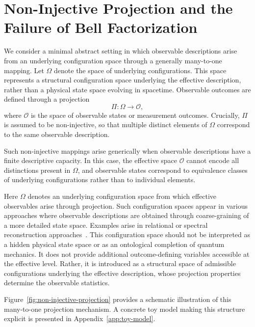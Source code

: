 \section{Non-Injective Projection and the Failure of Bell Factorization}
  \label{sec:non-injective-projection}

  We consider a minimal abstract setting in which observable descriptions arise from
  an underlying configuration space through a generally many-to-one mapping.
  Let $\Omega$ denote the space of underlying configurations.
  This space represents a structural configuration space underlying the effective
  description, rather than a physical state space evolving in spacetime.
  Observable outcomes are defined through a projection
  \begin{equation}
    \Pi : \Omega \rightarrow \mathcal{O},
  \end{equation}
  where $\mathcal{O}$ is the space of observable states or measurement outcomes.
  Crucially, $\Pi$ is assumed to be non-injective, so that multiple distinct elements
  of $\Omega$ correspond to the same observable description.

  Such non-injective mappings arise generically when observable descriptions have
  a finite descriptive capacity.
  In this case, the effective space $\mathcal{O}$ cannot encode all distinctions
  present in $\Omega$, and observable states correspond to equivalence classes
  of underlying configurations rather than to individual elements.

  Here $\Omega$ denotes an underlying configuration space from which
  effective observables arise through projection.
  Such configuration spaces appear in various approaches where observable
  descriptions are obtained through coarse-graining of a more detailed state space.
  Examples arise in relational or spectral reconstruction approaches~\cite{Beau2026a}.
  This configuration space should not be interpreted as a hidden physical state space
  or as an ontological completion of quantum mechanics.
  It does not provide additional outcome-defining variables accessible at the effective level.
  Rather, it is introduced as a structural space of admissible configurations underlying
  the effective description, whose projection properties determine the observable statistics.

  Figure~\ref{fig:non-injective-projection} provides a schematic illustration of this
  many-to-one projection mechanism.
  A concrete toy model making this structure explicit is presented in Appendix~\ref{app:toy-model}.

